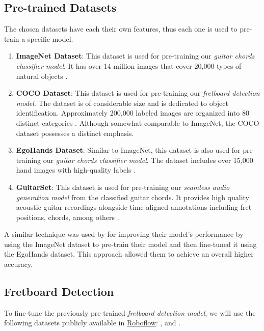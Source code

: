 \documentclass[10pt,twocolumn,letterpaper]{article}
\begin{document}
\subsection{Pre-trained Datasets}
The chosen datasets have each their own features, thus each one is used to pre-train a specific model.

\begin{enumerate}[label=\arabic*)]
    \item \textbf{ImageNet Dataset}: This dataset is used for pre-training our \emph{guitar chords classifier model}. It has over 14 million images that cover 20,000 types of natural objects \cite{russakovsky2015imagenetlargescalevisual}.
    \item \textbf{COCO Dataset}: This dataset is used for pre-training our \emph{fretboard detection model}. The dataset is of considerable size and is dedicated to object identification. Approximately 200,000 labeled images are organized into 80 distinct categories \cite{lin2015microsoftcococommonobjects}. Although somewhat comparable to ImageNet, the COCO dataset possesses a distinct emphasis.
    \item \textbf{EgoHands Dataset}: Similar to ImageNet, this dataset is also used for pre-training our \emph{guitar chords classifier model}. The dataset includes over 15,000 hand images with high-quality labels \cite{Bambach_2015_ICCV}.
    \item \textbf{GuitarSet}: This dataset is used for pre-training our \emph{seamless audio generation model} from the classified guitar chords. It provides high quality acoustic guitar recordings alongside time-aligned annotations including fret positions, chords, among others \cite{Xi2018}.
\end{enumerate}

A similar technique was used by \cite{Jadhav_transferlearning} for improving their model's performance by using the ImageNet dataset to pre-train their model and then fine-tuned it using the EgoHands dataset. This approach allowed them to achieve an overall higher accuracy.

\subsection{Fretboard Detection}\label{subsec:fretboard-detection}
To fine-tune the previously pre-trained \emph{fretboard detection model}, we will use the following datasets publicly available in \href{https://universe.roboflow.com/}{Roboflow}: \cite{guitar-chords-daewp_dataset}, \cite{guitar-ppfil_dataset} and \cite{done-npcll_dataset}.
\end{document}

